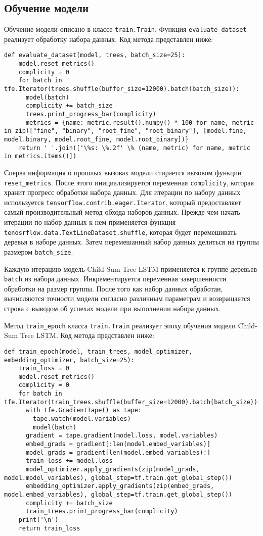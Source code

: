 \subsection{Обучение модели}
Обучение модели описано в классе \texttt{train.Train}. Функция \texttt{evaluate\_dataset} реализует обработку набора данных. Код метода представлен ниже:
\medskip
\begin{lstlisting}[style=Python]
  def evaluate_dataset(model, trees, batch_size=25):
    model.reset_metrics()
    complicity = 0
    for batch in tfe.Iterator(trees.shuffle(buffer_size=12000).batch(batch_size)):
      model(batch)
      complicity += batch_size
      trees.print_progress_bar(complicity)
      metrics = {name: metric.result().numpy() * 100 for name, metric in zip(["fine", "binary", "root_fine", "root_binary"], [model.fine, model.binary, model.root_fine, model.root_binary])}
    return ' '.join(['\%s: \%.2f' \% (name, metric) for name, metric in metrics.items()])
\end{lstlisting}
\medskip

Сперва информация о прошлых вызовах модели стирается вызовом функции \texttt{reset\_metrics}. После этого инициализируется переменная \texttt{complicity}, которая хранит прогресс обработки набора данных. Для итерации по набору данных используется \texttt{tensorflow.contrib.eager.Iterator}, который предоставляет самый производительный метод обхода наборов данных. Прежде чем начать итерации по набор данных к нем применяется функция \texttt{tenosrflow.data.TextLineDataset.shuffle}, которая будет перемешивать деревья в наборе данных. Затем перемешанный набор данных делиться на группы размером \texttt{batch\_size}.

Каждую итерацию модель Child-Sum Tree LSTM применяется к группе деревьев \texttt{batch} из набора данных. Инкрементируется переменная завершенности обработки на размер группы. После того как набор данных обработан, вычисляются точности модели согласно различным параметрам и возвращается строка с выводом об успехах модели при выполнении набора данных.

Метод \texttt{train\_epoch} класса \texttt{train.Train} реализует эпоху обучения модели Child-Sum Tree LSTM. Код метода представлен ниже:
\medskip
\begin{lstlisting}[style=Python]
  def train_epoch(model, train_trees, model_optimizer, embedding_optimizer, batch_size=25):
    train_loss = 0
    model.reset_metrics()
    complicity = 0
    for batch in tfe.Iterator(train_trees.shuffle(buffer_size=12000).batch(batch_size)):
      with tfe.GradientTape() as tape:
        tape.watch(model.variables)
        model(batch)
      gradient = tape.gradient(model.loss, model.variables)
      embed_grads = gradient[:len(model.embed_variables)]
      model_grads = gradient[len(model.embed_variables):]
      train_loss += model.loss
      model_optimizer.apply_gradients(zip(model_grads, model.model_variables), global_step=tf.train.get_global_step())
      embedding_optimizer.apply_gradients(zip(embed_grads, model.embed_variables), global_step=tf.train.get_global_step())
      complicity += batch_size
      train_trees.print_progress_bar(complicity)
    print('\n')
    return train_loss
\end{lstlisting}
\medskip
